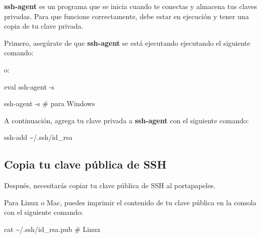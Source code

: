 \documentclass[
  letterpaper,
  DIV=11,
  numbers=noendperiod]{scrartcl}
\newenvironment{Shaded}{}{}
\newcommand{\AttributeTok}[1]{\textcolor[rgb]{0.84,0.23,0.29}{#1}}
\newcommand{\BuiltInTok}[1]{\textcolor[rgb]{0.84,0.23,0.29}{#1}}
\newcommand{\CommentTok}[1]{\textcolor[rgb]{0.42,0.45,0.49}{#1}}
\newcommand{\FunctionTok}[1]{\textcolor[rgb]{0.44,0.26,0.76}{#1}}
\newcommand{\NormalTok}[1]{\textcolor[rgb]{0.14,0.16,0.18}{#1}}
\newcommand{\StringTok}[1]{\textcolor[rgb]{0.01,0.18,0.38}{#1}}
\newcommand{\VariableTok}[1]{\textcolor[rgb]{0.89,0.38,0.04}{#1}}
\begin{document}
\textbf{ssh-agent} es un programa que se inicia cuando te conectas y
almacena tus claves privadas. Para que funcione correctamente, debe
estar en ejecución y tener una copia de tu clave privada.

Primero, asegúrate de que \textbf{ssh-agent} se está ejecutando
ejecutando el siguiente comando:

\begin{Shaded}
\end{Shaded}

o:

\begin{Shaded}
\begin{Highlighting}[]
\BuiltInTok{eval}\NormalTok{ ssh{-}agent }\AttributeTok{{-}s}
\end{Highlighting}
\end{Shaded}

\begin{Shaded}
\begin{Highlighting}[]
\FunctionTok{ssh{-}agent} \AttributeTok{{-}s} \CommentTok{\# para Windows}
\end{Highlighting}
\end{Shaded}

A continuación, agrega tu clave privada a \textbf{ssh-agent} con el
siguiente comando:

\begin{Shaded}
\begin{Highlighting}[]
\FunctionTok{ssh{-}add}\NormalTok{ \textasciitilde{}/.ssh/id\_rsa}
\end{Highlighting}
\end{Shaded}

\hypertarget{copia-tu-clave-puxfablica-de-ssh}{%
\subsection{Copia tu clave pública de
SSH}\label{copia-tu-clave-puxfablica-de-ssh}}

Después, necesitarás copiar tu clave pública de SSH al portapapeles.

Para Linux o Mac, puedes imprimir el contenido de tu clave pública en la
consola con el siguiente comando:

\begin{Shaded}
\begin{Highlighting}[]
\FunctionTok{cat}\NormalTok{ \textasciitilde{}/.ssh/id\_rsa.pub }\CommentTok{\# Linux}
\end{Highlighting}
\end{Shaded}
\end{document}
